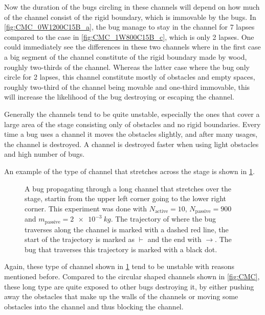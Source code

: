 Now the duration of the bugs circling in these channels will 
depend on how much of the channel consist of the rigid boundary, 
which is immovable by the bugs. In \cref{fig:CMC_0W1200C15B_a}, 
the bug manage to stay in the channel for 7 lapses compared to 
the case in \cref{fig:CMC_1W800C15B_c}, which is only 2 lapses. 
One could immediately see the differences in these two channels 
where in the first case a big segment of the channel constitute 
of the rigid boundary made by wood, roughly two-thirds of the channel. 
Whereas the latter case where the bug only circle for 2 lapses, 
this channel constitute mostly of obstacles and empty spaces, 
roughly two-third of the channel being movable and one-third immovable, 
this will increase the likelihood of the bug destroying or escaping the channel. 

Generally the channels tend to be quite unstable, especially the ones 
that cover a large area of the stage consisting only of obstacles and 
no rigid boundaries. Every time a bug uses a channel it moves 
the obstacles slightly, and after many usages, the channel is destroyed. 
A channel is destroyed faster when using light obstacles and high number of bugs.

An example of the type of channel that stretches across the stage 
is shown in \cref{fig:CM_0W900C10B}.

\begin{figure}[htpb!]
\centering
{}
\caption{A bug propagating through a long channel that stretches over the stage, 
startin from the upper left corner going to the lower right corner.
This experiment was done with $N_{\text{active}}=10$, $N_{\text{passive}}=900$ and 
$m_{\text{passive}}=\SI{2e-3}{kg}$. The trajectory of where the bug traverses along the 
channel is marked with a dashed red line, the start of the trajectory is marked as $\vdash$ and the 
end with $\rightarrow$. The bug that traverses this trajectory is marked with a black dot.} 
\label{fig:CM_0W900C10B}
\end{figure}

Again, these type of channel shown in \cref{fig:CM_0W900C10B} 
tend to be unstable with reasons mentioned before. 
Compared to the circular shaped channels shown in \cref{fig:CMC}, these long type 
are quite exposed to other bugs destroying it, by either pushing away 
the obstacles that make up the walls of the channels or moving some 
obstacles into the channel and thus blocking the channel. 

